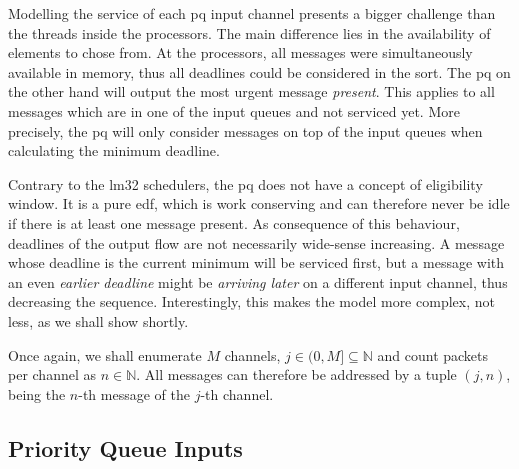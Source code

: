 Modelling the service of each \gls{pq} input channel presents a bigger challenge than the threads inside the processors. The main difference lies in the availability of elements to chose from.
At the processors, all messages were simultaneously available in memory, thus all deadlines could be considered in the sort.
The \gls{pq} on the other hand will output the most urgent message \emph{present}. This applies to all messages which are in one of the input queues and not serviced yet.
More precisely, the \gls{pq} will only consider messages on top of the input queues when calculating the minimum deadline.
\par
Contrary to the \gls{lm32} schedulers, the \gls{pq} does not have a concept of eligibility window. It is a pure \gls{edf}, which is work conserving and can therefore never be idle if there is at least one message present.
As consequence of this behaviour, deadlines of the output flow are not necessarily wide-sense increasing. A message whose deadline is the current minimum will be serviced first,
but a message with an even \emph{earlier deadline} might be \emph{arriving later} on a different input channel, thus decreasing the sequence.
Interestingly, this makes the model more complex, not less, as we shall show shortly.
\par
Once again, we shall enumerate $M$ channels, $j \in (0,M] \subseteq \mathbb{N}$ and count packets per channel as $n \in \mathbb{N}$.
All messages can therefore be addressed by a tuple $(j,n)$, being the $n$-th message of the $j$-th channel.

\subsection{Priority Queue Inputs}

